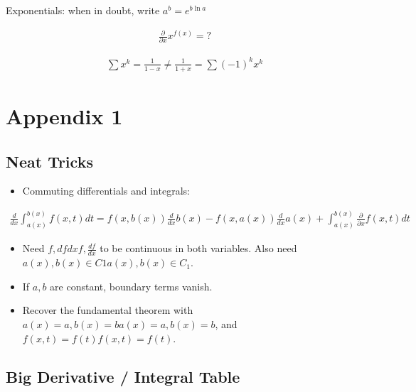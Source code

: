 Exponentials: when in doubt, write \(a^b = e^{b\ln a}\)

\begin{align*}
\frac{\partial}{\partial x} x^{f(x)} = ?
\end{align*}

\begin{align*}
\sum x^k = \frac{1}{1-x} \neq \frac{1}{1+x} = \sum (-1)^k x^k
\end{align*}

\hypertarget{appendix-1}{%
\section{Appendix 1}\label{appendix-1}}

\hypertarget{neat-tricks}{%
\subsection{Neat Tricks}\label{neat-tricks}}

\begin{itemize}
\tightlist
\item
  Commuting differentials and integrals:
\end{itemize}

\begin{align*}
\frac{d}{dx} \int_{a(x)}^{b(x)} f(x,t) dt = f(x, b(x))\frac{d}{dx}b(x) - f(x, a(x))\frac{d}{dx}a(x) + \int_{a(x)}^{b(x)} \frac{\partial}{\partial x} f(x, t) dt
\end{align*}

\begin{itemize}
\tightlist
\item
  Need \(f,dfdxf, \frac{df}{dx}\) to be continuous in both variables.
  Also need \(a(x),b(x)∈C1a(x),b(x) \in C_1\).
\item
  If \(a,b\) are constant, boundary terms vanish.
\item
  Recover the fundamental theorem with
  \(a(x)=a,b(x)=ba(x) = a, b(x) = b\), and \(f(x,t)=f(t)f(x,t) = f(t)\).
\end{itemize}

\hypertarget{big-derivative-integral-table}{%
\subsection{Big Derivative / Integral
Table}\label{big-derivative-integral-table}}

